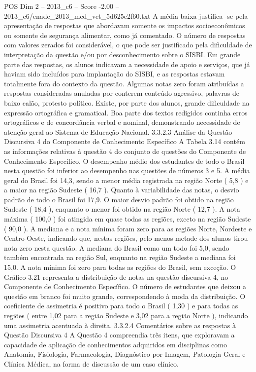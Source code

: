 \begin{textsample}{POS Dim 2 – 2013\_c6 – Score -2.00 – 2013\_c6/enade\_2013\_med\_vet\_5d625e2f60.txt}
A média baixa justifica -se pela apresentação de respostas que abordavam somente os impactos socioeconômicos ou somente de segurança alimentar, como já comentado.
O número de respostas com valores zerados foi considerável, o que pode ser justificado pela dificuldade de interpretação da questão e/ou por desconhecimento sobre o SISBI.
Em grande parte das respostas, os alunos indicavam a necessidade de apoio e serviços, que já haviam sido incluídos para implantação do SISBI, e as respostas estavam totalmente fora do contexto da questão.
Algumas notas zero foram atribuídas a respostas consideradas anuladas por conterem conteúdo agressivo, palavras de baixo calão, protesto político.
Existe, por parte dos alunos, grande dificuldade na expressão ortográfica e gramatical.
Boa parte dos textos redigidos continha erros ortográficos e de concordância verbal e nominal, demonstrando necessidade de atenção geral ao Sistema de Educação Nacional. 3.3.2.3 Análise da Questão Discursiva 4 do Componente de Conhecimento Específico A Tabela 3.14 contém as informações relativas à questão 4 do conjunto de questões do Componente de Conhecimento Específico.
O desempenho médio dos estudantes de todo o Brasil nesta questão foi inferior ao desempenho nas questões de números 3 e 5.
A média geral do Brasil foi 14,3, sendo a menor média registrada na região Norte ( 5,8 ) e a maior na região Sudeste ( 16,7 ).
Quanto à variabilidade das notas, o desvio padrão de todo o Brasil foi 17,9.
O maior desvio padrão foi obtido na região Sudeste ( 18,4 ), enquanto o menor foi obtido na região Norte ( 12,7 ).
A nota máxima ( 100,0 ) foi atingida em quase todas as regiões, exceto na região Sudeste ( 90,0 ).
A mediana e a nota mínima foram zero para as regiões Norte, Nordeste e Centro-Oeste, indicando que, nestas regiões, pelo menos metade dos alunos tirou nota zero nesta questão.
A mediana do Brasil como um todo foi 5,0, sendo também encontrada na região Sul, enquanto na região Sudeste a mediana foi 15,0.
A nota mínima foi zero para todas as regiões do Brasil, sem exceção.
O Gráfico 3.21 representa a distribuição de notas na questão discursiva 4, no Componente de Conhecimento Específico.
O número de estudantes que deixou a questão em branco foi muito grande, correspondendo à moda da distribuição.
O coeficiente de assimetria é positivo para todo o Brasil ( 1,30 ) e para todas as regiões ( entre 1,02 para a região Sudeste e 3,02 para a região Norte ), indicando uma assimetria acentuada à direita. 3.3.2.4 Comentários sobre as respostas à Questão Discursiva 4 A Questão 4 compreendia três itens, que exploravam a capacidade de aplicação de conhecimentos adquiridos em disciplinas como Anatomia, Fisiologia, Farmacologia, Diagnóstico por Imagem, Patologia Geral e Clínica Médica, na forma de discussão de um caso clínico.

\end{textsample}
